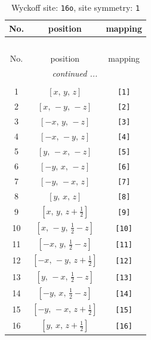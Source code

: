 \documentclass[fleqn,8pt]{jsarticle}
\begin{document}
\begin{longtable}{ccc}
\caption{Wyckoff site: {\tt 16o}, site symmetry: {\tt 1}}
 \\
 \hline \hline
No. & position & mapping \\ \hline \endfirsthead

\multicolumn{2}{l}{\tablename\ \thetable{}} \\
 \hline \hline
No. & position & mapping \\ \hline \endhead

 \hline \hline
\multicolumn{2}{r}{\footnotesize\it continued ...} \\ \endfoot

 \hline \hline
\multicolumn{2}{r}{} \\ \endlastfoot

1 & $\left[ x,\, y,\, z \right]$ & {\tt [1]} \\ \hline
2 & $\left[ x,\, - y,\, - z \right]$ & {\tt [2]} \\ \hline
3 & $\left[ - x,\, y,\, - z \right]$ & {\tt [3]} \\ \hline
4 & $\left[ - x,\, - y,\, z \right]$ & {\tt [4]} \\ \hline
5 & $\left[ y,\, - x,\, - z \right]$ & {\tt [5]} \\ \hline
6 & $\left[ - y,\, x,\, - z \right]$ & {\tt [6]} \\ \hline
7 & $\left[ - y,\, - x,\, z \right]$ & {\tt [7]} \\ \hline
8 & $\left[ y,\, x,\, z \right]$ & {\tt [8]} \\ \hline
9 & $\left[ x,\, y,\, z + \frac{1}{2} \right]$ & {\tt [9]} \\ \hline
10 & $\left[ x,\, - y,\, \frac{1}{2} - z \right]$ & {\tt [10]} \\ \hline
11 & $\left[ - x,\, y,\, \frac{1}{2} - z \right]$ & {\tt [11]} \\ \hline
12 & $\left[ - x,\, - y,\, z + \frac{1}{2} \right]$ & {\tt [12]} \\ \hline
13 & $\left[ y,\, - x,\, \frac{1}{2} - z \right]$ & {\tt [13]} \\ \hline
14 & $\left[ - y,\, x,\, \frac{1}{2} - z \right]$ & {\tt [14]} \\ \hline
15 & $\left[ - y,\, - x,\, z + \frac{1}{2} \right]$ & {\tt [15]} \\ \hline
16 & $\left[ y,\, x,\, z + \frac{1}{2} \right]$ & {\tt [16]} \\
\end{longtable}
\end{document}

